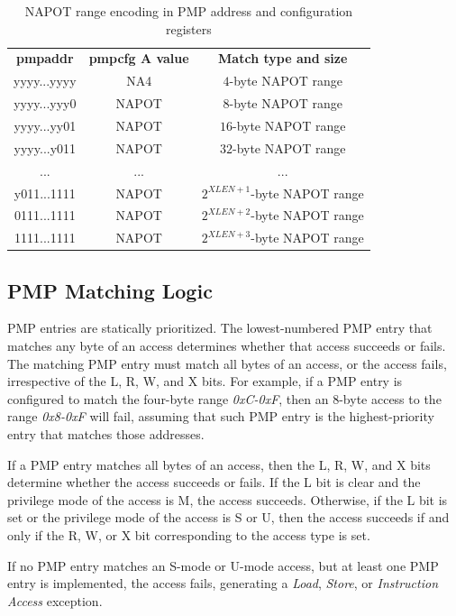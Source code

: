 \begin{table}
  \centering
  \begin{tabular}{|c|c|c|}
    \hline
    \textbf{pmpaddr}          & \textbf{pmpcfg A value} & \textbf{Match type and size}  \\
    \hhline {===} yyyy...yyyy & NA4                     & $4$-byte NAPOT range          \\
    \hline
    yyyy...yyy0               & NAPOT                   & $8$-byte NAPOT range          \\
    \hline
    yyyy...yy01               & NAPOT                   & $16$-byte NAPOT range         \\
    \hline
    yyyy...y011               & NAPOT                   & $32$-byte NAPOT range         \\
    \hline
    ...                       & ...                     & ...                           \\
    \hline
    y011...1111               & NAPOT                   & $2^{XLEN+1}$-byte NAPOT range \\
    \hline
    0111...1111               & NAPOT                   & $2^{XLEN+2}$-byte NAPOT range \\
    \hline
    1111...1111               & NAPOT                   & $2^{XLEN+3}$-byte NAPOT range \\
    \hline
  \end{tabular}
  \caption{NAPOT range encoding in PMP address and configuration registers}
  \label{tab:napotencodings}
\end{table}

\subsection{PMP Matching Logic}
\label{subsec:matchinglogic}

PMP entries are statically prioritized. The lowest-numbered PMP entry that
matches any byte of an access determines whether that access succeeds or fails. The
matching PMP entry must match all bytes of an access, or the access fails, irrespective
of the L, R, W, and X bits. For example, if a PMP entry is configured to match
the four-byte range \textit{0xC-0xF}, then an $8$-byte access to the range
\textit{0x8-0xF} will fail, assuming that such PMP entry is the highest-priority
entry that matches those addresses.

If a PMP entry matches all bytes of an access, then the L, R, W, and X bits
determine whether the access succeeds or fails. If the L bit is clear and the privilege
mode of the access is M, the access succeeds. Otherwise, if the L bit is set or
the privilege mode of the access is S or U, then the access succeeds if and only
if the R, W, or X bit corresponding to the access type is set.

If no PMP entry matches an S-mode or U-mode access, but at least one PMP entry
is implemented, the access fails, generating a \textit{Load}, \textit{Store}, or
\textit{Instruction Access} exception.